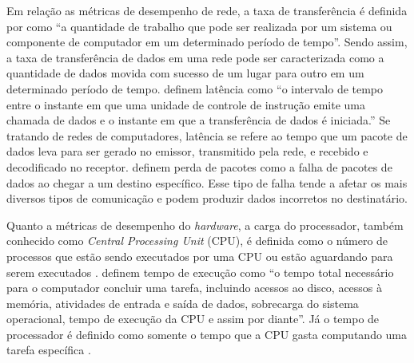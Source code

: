 Em relação as métricas de desempenho de rede, a taxa de transferência é definida por \cite[p.~77, tradução nossa]{IEEE.Standard.Glossary} como ``a quantidade de trabalho que pode ser realizada por um sistema ou componente de computador em um determinado período de tempo''. Sendo assim, a taxa de transferência de dados em uma rede pode ser caracterizada como a quantidade de dados movida com sucesso de um lugar para outro em um determinado período de tempo.
\cite[p.~43, tradução nossa]{IEEE.Standard.Glossary} definem latência como ``o intervalo de tempo entre o instante em que uma unidade de controle de instrução emite uma chamada de dados e o instante em que a transferência de dados é iniciada.'' Se tratando de redes de computadores, latência se refere ao tempo que um pacote de dados leva para ser gerado no emissor, transmitido pela rede, e recebido e decodificado no receptor.
\cite{Bhadra2015} definem perda de pacotes como a falha de pacotes de dados ao chegar a um destino específico. Esse tipo de falha tende a afetar os mais diversos tipos de comunicação e podem produzir dados incorretos no destinatário.

Quanto a métricas de desempenho do \textit{hardware}, a carga do processador, também conhecido como \textit{Central Processing Unit} (CPU), é definida como o número de processos que estão sendo executados por uma CPU ou estão aguardando para serem executados \cite{Sebastian2014}.
\cite[p.~242, tradução nossa]{Patterson2014-qv} definem tempo de execução como ``o tempo total necessário para o computador concluir uma tarefa, incluindo acessos ao disco, acessos à memória, atividades de entrada e saída de dados, sobrecarga do sistema operacional, tempo de execução da CPU e assim por diante''. Já o tempo de processador é definido como somente o tempo que a CPU gasta computando uma tarefa específica \cite{Patterson2014-qv}.
